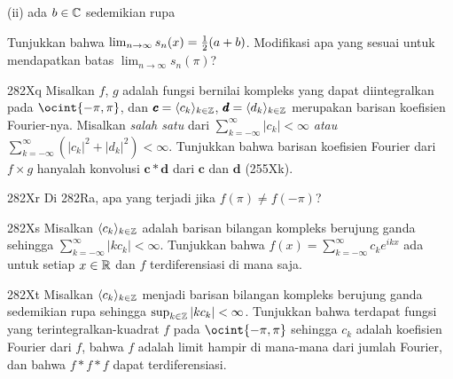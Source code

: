 {


(ii) ada $b\in\Bbb C$ sedemikian rupa



\noindent Tunjukkan bahwa $\lim_{n\to\infty}s_n(x)={1\over 2}(a+b)$.
Modifikasi apa yang sesuai untuk mendapatkan batas
$\lim_{n\to\infty}s_n(\pi)$?

\sqheader 282Xq Misalkan $f$, $g$ adalah fungsi
bernilai kompleks yang dapat diintegralkan pada $\ocint{-\pi,\pi}$, dan
$\pmb{c}=\langle c_k\rangle_{k\in\Bbb Z}$,
$\pmb{d}=\langle d_k\rangle_{k\in\Bbb Z}$
merupakan barisan koefisien Fourier-nya.   Misalkan {\it salah satu} dari
$\sum_{k=-\infty}^{\infty}|c_k|<\infty$ {\it atau}
$\sum_{k=-\infty}^{\infty}(|c_k|^2+|d_k|^2)<\infty$.   Tunjukkan bahwa barisan
koefisien Fourier dari $f\times g$ hanyalah konvolusi
$\pmb{c}*\pmb{d}$ dari $\pmb{c}$ dan $\pmb{d}$ (255Xk).

\spheader 282Xr Di 282Ra, apa yang terjadi jika $f(\pi)\ne f(-\pi)$?

\spheader 282Xs  Misalkan $\langle c_k\rangle_{k\in\Bbb Z}$
adalah barisan bilangan kompleks berujung ganda sehingga
$\sum_{k=-\infty}^{\infty}|kc_k|<\infty$.   Tunjukkan bahwa
$f(x)=\sum_{k=-\infty}^{\infty}c_ke^{ikx}$ ada untuk setiap
$x\in\Bbb R$ dan $f$ terdiferensiasi di mana saja.

\spheader 282Xt Misalkan $\langle c_k\rangle_{k\in\Bbb Z}$ menjadi barisan bilangan kompleks berujung ganda
sedemikian rupa sehingga
$\sup_{k\in\Bbb Z}|kc_k|<\infty$.   Tunjukkan bahwa terdapat fungsi
yang terintegralkan-kuadrat $f$
pada $\ocint{-\pi,\pi}$ sehingga $c_k$ adalah koefisien Fourier
dari $f$, bahwa $f$ adalah limit hampir di mana-mana dari jumlah Fourier, dan bahwa $f*f*f$ dapat terdiferensiasi.   

}
